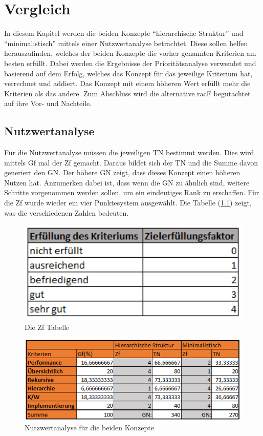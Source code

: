 \chapter{Vergleich}
\label{ch:chapter05}
In diesem Kapitel werden die beiden Konzepte "`hierarchische Struktur"' und "`minimalistisch"' mittels einer Nutzwertanalyse betrachtet.
Diese sollen helfen herauszufinden, welches der beiden Konzepte die vorher genannten Kriterien am besten erfüllt.
Dabei werden die Ergebnisse der Prioritätsanalyse verwendet und basierend auf dem Erfolg, welches das Konzept für das jeweilige Kriterium hat, verrechnet und addiert.
Das Konzept mit einem höheren Wert erfüllt mehr die Kriterien als das andere.
Zum Abschluss wird die alternative racF begutachtet auf ihre Vor- und Nachteile.

\section{Nutzwertanalyse}
\label{sec:chapter05:Nutz}
Für die Nutzwertanalyse müssen die jeweiligen \ac{TN} bestimmt werden.
Dies wird mittels \ac{Gf} mal der \ac{Zf} gemacht.
Daraus bildet sich der \ac{TN} und die Summe davon generiert den \ac{GN}.
Der höhere \ac{GN} zeigt, dass dieses Konzept einen höheren Nutzen hat.
Anzumerken dabei ist, dass wenn die \ac{GN} zu ähnlich sind, weitere Schritte vorgenommen werden sollen, um ein eindeutiges Rank zu erschaffen.
Für die \ac{Zf} wurde wieder ein vier Punktesystem ausgewählt.
Die Tabelle (\ref{fig:Ziel}) zeigt, was die verschiedenen Zahlen bedeuten. \cite{BdIufH}
\begin{figure}[h!]
 \centering
 \includegraphics[width=1\textwidth]{gfx/Picture/Ziel.PNG}
 \caption{Die Zf Tabelle}
 \label{fig:Ziel}
\end{figure}
\newpage
\begin{figure}[h!]
 \centering
 \includegraphics[width=1\textwidth]{gfx/Picture/Nutzwert.PNG}
 \caption{Nutzwertanalyse für die beiden Konzepte}
 \label{fig:Nutz}
\end{figure}

